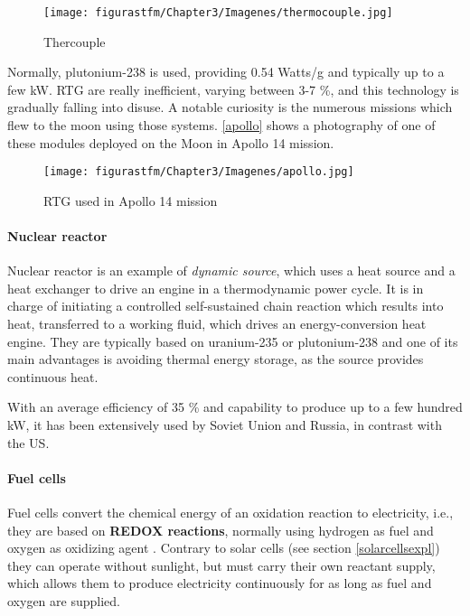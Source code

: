 			\begin{figure}[H] 
				\centering
				\texttt{[image: figurastfm/Chapter3/Imagenes/thermocouple.jpg]}
				\caption{Thercouple \cite{wiki}}      		
				\label{thermocoup}
				\vspace{-2cm}
  		\end{figure}

Normally, plutonium-238 is used, providing 0.54 Watts/g \cite{rtgefec} and typically up to a few kW. \acrshort{RTG} are really inefficient, varying between 3-7 \%, and this technology is gradually falling into disuse. A notable curiosity is the numerous missions which flew to the moon using those systems\cite{rtgefec}. \autoref{apollo} shows a photography of one of these modules deployed on the Moon in Apollo 14 mission.

			\begin{figure}[H] 
				\centering
				\texttt{[image: figurastfm/Chapter3/Imagenes/apollo.jpg]}
				\caption{\acrshort{RTG} used in Apollo 14 mission \cite{wiki}}      		
				\label{apollo}
  		\end{figure}
\paragraph{Nuclear reactor}

Nuclear reactor is an example of \textit{dynamic source}, which uses a heat source and a heat exchanger to drive an engine in a thermodynamic power cycle. It is in charge of initiating a controlled self-sustained chain reaction which results into heat, transferred to a working fluid, which drives an energy-conversion heat engine. They are typically based on uranium-235 or plutonium-238 and one of its main advantages is avoiding thermal energy storage, as the source provides continuous heat. 

With an average efficiency of 35 \% and capability to produce up to a few hundred kW, it has been extensively used by Soviet Union and Russia, in contrast with the US.

\paragraph{Fuel cells} \label{fuelcell}
 
Fuel cells convert the chemical energy of an oxidation reaction to electricity, i.e., they are based on \textbf{REDOX reactions}, normally using hydrogen as fuel and oxygen as oxidizing agent \cite{wiki}. Contrary to solar cells (see section \ref{solarcellsexpl}) they can operate without sunlight, but must carry their own reactant supply, which allows them to produce electricity continuously for as long as fuel and oxygen are supplied.


